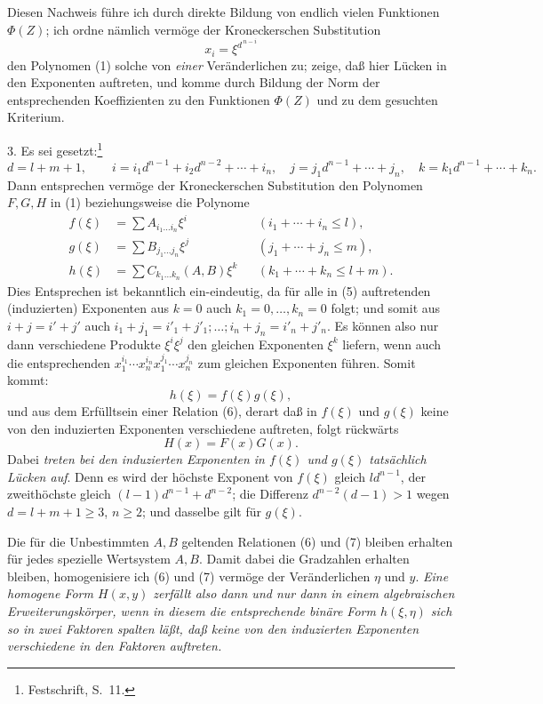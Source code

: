 Diesen Nachweis führe ich durch direkte Bildung von endlich vielen Funktionen $\Phi(Z)$; ich ordne nämlich vermöge der Kroneckerschen Substitution
\[
 x_i=\xi^{d^{\,n-i}}
\]
den Polynomen (1) solche von \emph{einer} Veränderlichen zu; zeige, daß hier Lücken in den Exponenten auftreten, und komme durch Bildung der Norm der entsprechenden Koeffizienten zu den Funktionen $\Phi(Z)$ und zu dem gesuchten Kriterium.

3. Es sei gesetzt:\footnote{Festschrift, S.~11.}
\begin{equation}
 d=l+m+1,\qquad
 i=i_1d^{n-1}+i_2d^{n-2}+\cdots+i_n,
\quad
 j=j_1d^{n-1}+\cdots+j_n,
\quad
 k=k_1d^{n-1}+\cdots+k_n.
\tag{4}
\end{equation}
Dann entsprechen vermöge der Kroneckerschen Substitution den Polynomen $F,G,H$ in (1) beziehungsweise die Polynome
\begin{equation}
\begin{aligned}
 f(\xi)&=\sum A_{i_1\ldots i_n}\xi^i &&(i_1+\cdots+i_n\le l),\\
 g(\xi)&=\sum B_{j_1\ldots j_n}\xi^j &&(j_1+\cdots+j_n\le m),\\
 h(\xi)&=\sum C_{k_1\ldots k_n}(A,B)\xi^k &&(k_1+\cdots+k_n\le l+m).
\end{aligned}
\tag{5}
\end{equation}
Dies Entsprechen ist bekanntlich ein-eindeutig, da für alle in (5) auftretenden (induzierten) Exponenten aus $k=0$ auch $k_1=0,\ldots,k_n=0$ folgt; und somit aus $i+j=i'+j'$ auch $i_1+j_1=i'_1+j'_1;\ldots;i_n+j_n=i'_n+j'_n$. Es können also nur dann verschiedene Produkte $\xi^i\xi^j$ den gleichen Exponenten $\xi^k$ liefern, wenn auch die entsprechenden $x_1^{i_1}\cdots x_n^{i_n}x_1^{j_1}\cdots x_n^{j_n}$ zum gleichen Exponenten führen. Somit kommt:
\begin{equation}
 h(\xi)=f(\xi)g(\xi),
\tag{6}
\end{equation}
und aus dem Erfülltsein einer Relation (6), derart daß in $f(\xi)$ und $g(\xi)$ keine von den induzierten Exponenten verschiedene auftreten, folgt rückwärts
\begin{equation}
 H(x)=F(x)G(x).
\tag{7}
\end{equation}
Dabei \emph{treten bei den induzierten Exponenten in $f(\xi)$ und $g(\xi)$ tatsächlich Lücken auf}. Denn es wird der höchste Exponent von $f(\xi)$ gleich $ld^{n-1}$, der zweithöchste gleich $(l-1)d^{n-1}+d^{n-2}$; die Differenz $d^{n-2}(d-1)>1$ wegen $d=l+m+1\ge3$, $n\ge2$; und dasselbe gilt für $g(\xi)$.

Die für die Unbestimmten $A,B$ geltenden Relationen (6) und (7) bleiben erhalten für jedes spezielle Wertsystem $A,B$. Damit dabei die Gradzahlen erhalten bleiben, homogenisiere ich (6) und (7) vermöge der Veränderlichen $\eta$ und $y$. \emph{Eine homogene Form $H(x,y)$ zerfällt also dann und nur dann in einem algebraischen Erweiterungskörper, wenn in diesem die entsprechende binäre Form $h(\xi,\eta)$ sich so in zwei Faktoren spalten läßt, daß keine von den induzierten Exponenten verschiedene in den Faktoren auftreten.}

